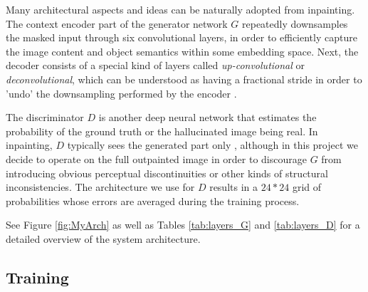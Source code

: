 \documentclass[twocolumn,showpacs,%
  nofootinbib,aps,superscriptaddress,%
  eqsecnum,prd,notitlepage,showkeys,10pt]{revtex4-1}
\begin{document}
\hspace{\parindent} Many architectural aspects and ideas can be naturally adopted from inpainting. The context encoder part of the generator network $G$ repeatedly downsamples the masked input through six convolutional layers, in order to efficiently capture the image content and object semantics within some embedding space. Next, the decoder consists of a special kind of layers called \textit{up-convolutional} or \textit{deconvolutional}, which can be understood as having a fractional stride in order to 'undo' the downsampling performed by the encoder \cite{Pathak2016}.

The discriminator $D$ is another deep neural network that estimates the probability of the ground truth or the hallucinated image being real. In inpainting, $D$ typically sees the generated part only \cite{Pathak2016}, although in this project we decide to operate on the full outpainted image in order to discourage $G$ from introducing obvious perceptual discontinuities or other kinds of structural inconsistencies. The architecture we use for $D$ results in a $24*24$ grid of probabilities whose errors are averaged during the training process.

See Figure \ref{fig:MyArch} as well as Tables \ref{tab:layers_G} and \ref{tab:layers_D} for a detailed overview of the system architecture.

\subsection{Training}
\end{document}
